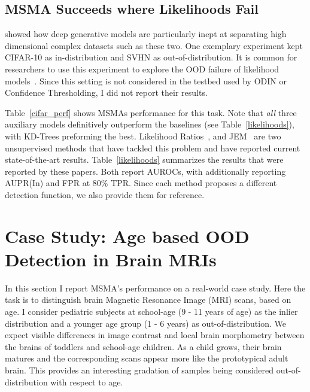 \subsection*{MSMA Succeeds where Likelihoods Fail}

\cite{nalisnick2018do} showed how deep generative models are particularly inept at separating high dimensional complex datasets such as these two. One exemplary experiment kept CIFAR-10 as in-distribution and SVHN as out-of-distribution. It is common for researchers to use this experiment to explore the OOD failure of likelihood models~\cite{why_norm_fails,Ren2019,Grathwohl2020Your}. Since this setting is not considered in the testbed used by ODIN or Confidence Thresholding, I did not report their results. 

Table~\ref{cifar_perf} shows MSMAs performance for this task. Note that \textit{all} three auxiliary models definitively outperform the baselines (see Table~\ref{likelihoods}), with KD-Trees preforming the best. Likelihood Ratios~\cite{Ren2019}, and JEM~\cite{Grathwohl2020Your} are two unsupervised methods that have tackled this problem and have reported current state-of-the-art results. Table~\ref{likelihoods} summarizes the results that were reported by these papers. Both report AUROCs, with \cite{Ren2019} additionally reporting AUPR(In) and FPR at 80\% TPR. Since each method proposes a different detection function, we also provide them for reference.
\goodbreak

\section{Case Study: Age based OOD Detection in Brain MRIs}
\label{sec:brain_experiment}

In this section I report MSMA's performance on a real-world case study. Here the task is to distinguish brain Magnetic Resonance Image (MRI) scans, based on age. I consider pediatric subjects at school-age (9 - 11 years of age) as the inlier distribution and a younger age group (1 - 6 years) as out-of-distribution. We expect visible differences in image contrast and local brain morphometry between the brains of toddlers and school-age children. As a child grows, their brain matures and the corresponding scans appear more like the prototypical adult brain. This provides an interesting gradation of samples being considered out-of-distribution with respect to age.

